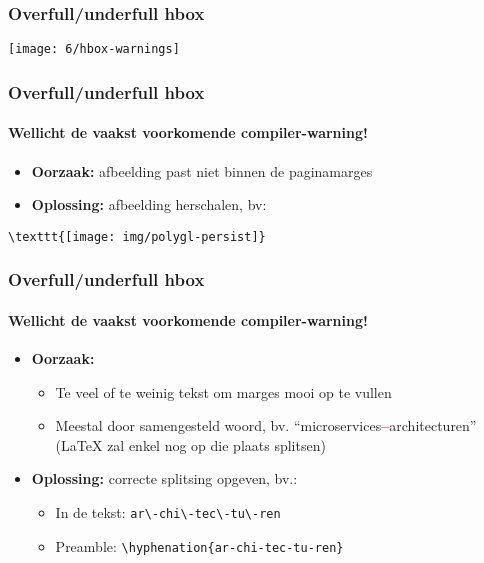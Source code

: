 \documentclass[aspectratio=169]{beamer}
\begin{document}
\begin{frame}
  \frametitle{Overfull/underfull hbox}

  \texttt{[image: 6/hbox-warnings]}

\end{frame}

\begin{frame}[fragile]
  \frametitle{Overfull/underfull hbox}
  \framesubtitle{Wellicht de vaakst voorkomende compiler-warning!}

  \begin{itemize}
    \item \textbf{Oorzaak:} afbeelding past niet binnen de paginamarges
    \item \textbf{Oplossing:} afbeelding herschalen, bv:
  \end{itemize}

  \begin{verbatim}
\texttt{[image: img/polygl-persist]}
\end{verbatim}

\end{frame}

\begin{frame}[fragile]
  \frametitle{Overfull/underfull hbox}
  \framesubtitle{Wellicht de vaakst voorkomende compiler-warning!}

  \begin{itemize}
    \item \textbf{Oorzaak:}
          \begin{itemize}
            \item Te veel of te weinig tekst om marges mooi op te vullen
            \item Meestal door samengesteld woord, bv. ``microservices\textcolor{red}{\textbf{--}}architecturen''
                  ({\LaTeX} zal enkel nog op die plaats splitsen)
          \end{itemize}
    \item \textbf{Oplossing:} correcte splitsing opgeven, bv.:
          \begin{itemize}
            \item In de tekst: \verb|ar\-chi\-tec\-tu\-ren|
            \item Preamble: \verb|\hyphenation{ar-chi-tec-tu-ren}|
          \end{itemize}
  \end{itemize}

\end{frame}
\end{document}
